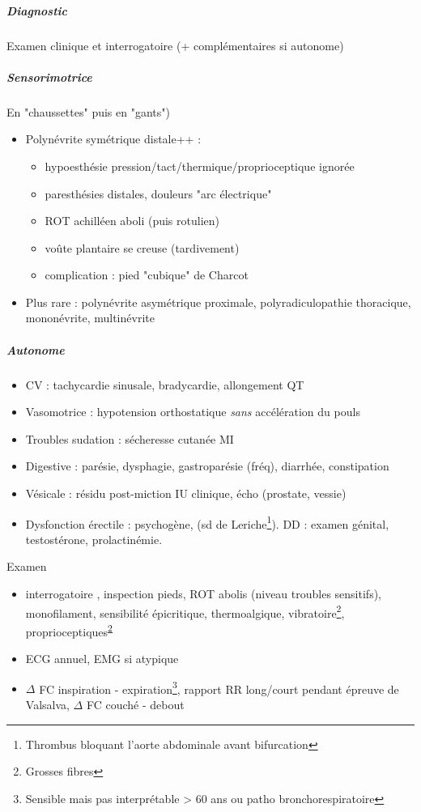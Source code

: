 \documentclass[11pt]{article}
\begin{document}
\subparagraph{Diagnostic}
\label{sec:org18eefdc}
Examen clinique et interrogatoire (+ complémentaires si autonome)

\subparagraph{Sensorimotrice}
\label{sec:orge2bd6d0}
En "chaussettes" puis en "gants")
\begin{itemize}
\item Polynévrite symétrique distale++ :
\begin{itemize}
\item hypoesthésie pression/tact/thermique/proprioceptique ignorée
\item \textpm{} paresthésies distales, douleurs "arc électrique"
\item ROT achilléen aboli (puis rotulien)
\item voûte plantaire se creuse (tardivement)
\item complication : pied "cubique" de Charcot
\end{itemize}
\item Plus rare : polynévrite asymétrique proximale, polyradiculopathie
thoracique, mononévrite, multinévrite
\end{itemize}

\subparagraph{Autonome}
\label{sec:org4506267}
\begin{itemize}
\item CV : tachycardie sinusale, bradycardie, allongement QT
\item Vasomotrice : hypotension orthostatique \emph{sans} accélération du pouls
\item Troubles sudation : sécheresse cutanée MI
\item Digestive : parésie, dysphagie, gastroparésie (fréq), diarrhée, constipation
\item Vésicale : résidu post-miction \thus IU \thus clinique, écho (prostate, vessie)
\item Dysfonction érectile : psychogène, (sd de Leriche\footnote{Thrombus bloquant l'aorte abdominale avant bifurcation}). DD : examen génital, testostérone, prolactinémie.
\end{itemize}

Examen 
\begin{itemize}
\item interrogatoire , inspection pieds, ROT abolis (niveau troubles sensitifs), monofilament, sensibilité épicritique, thermoalgique, vibratoire\footnote{Grosses fibres\label{orgcd6b8f2}}, proprioceptiques\textsuperscript{\ref{orgcd6b8f2}}
\item ECG annuel, EMG si atypique
\item \(\Delta\) FC inspiration - expiration\footnote{Sensible mais pas interprétable > 60 ans ou patho bronchorespiratoire}, rapport RR long/court pendant épreuve de
Valsalva, \(\Delta\) FC couché - debout
\end{itemize}
\end{document}
